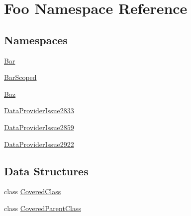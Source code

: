 \hypertarget{namespace_foo}{}\section{Foo Namespace Reference}
\label{namespace_foo}
\subsection*{Namespaces}
\begin{DoxyCompactItemize}
\item 
 \mbox{\hyperlink{namespace_foo_1_1_bar}{Bar}}
\item 
 \mbox{\hyperlink{namespace_foo_1_1_bar_scoped}{Bar\+Scoped}}
\item 
 \mbox{\hyperlink{namespace_foo_1_1_baz}{Baz}}
\item 
 \mbox{\hyperlink{namespace_foo_1_1_data_provider_issue2833}{Data\+Provider\+Issue2833}}
\item 
 \mbox{\hyperlink{namespace_foo_1_1_data_provider_issue2859}{Data\+Provider\+Issue2859}}
\item 
 \mbox{\hyperlink{namespace_foo_1_1_data_provider_issue2922}{Data\+Provider\+Issue2922}}
\end{DoxyCompactItemize}
\subsection*{Data Structures}
\begin{DoxyCompactItemize}
\item 
class \mbox{\hyperlink{class_foo_1_1_covered_class}{Covered\+Class}}
\item 
class \mbox{\hyperlink{class_foo_1_1_covered_parent_class}{Covered\+Parent\+Class}}
\end{DoxyCompactItemize}

